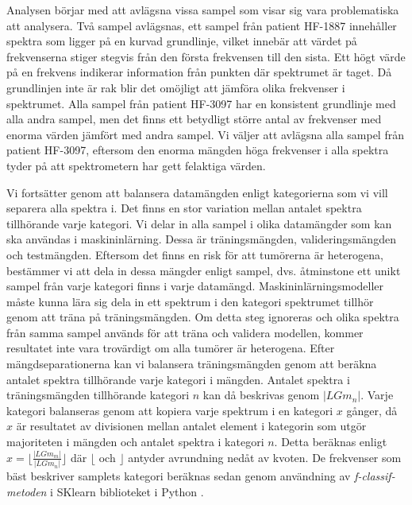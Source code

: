 Analysen börjar med att avlägsna vissa sampel som visar sig vara problematiska att analysera. Två sampel avlägsnas, ett sampel från patient HF-1887 innehåller spektra som ligger på en kurvad grundlinje, vilket innebär att värdet på frekvenserna stiger stegvis från den första frekvensen till den sista. Ett högt värde på en frekvens indikerar information från punkten där spektrumet är taget. Då grundlinjen inte är rak blir det omöjligt att jämföra olika frekvenser i spektrumet. Alla sampel från patient HF-3097 har en konsistent grundlinje med alla andra sampel, men det finns ett betydligt större antal av frekvenser med enorma värden jämfört med andra sampel. Vi väljer att avlägsna alla sampel från patient HF-3097, eftersom den enorma mängden höga frekvenser i alla spektra tyder på att spektrometern har gett felaktiga värden.

Vi fortsätter genom att balansera datamängden enligt kategorierna som vi vill separera alla spektra i. Det finns en stor variation mellan antalet spektra tillhörande varje kategori. Vi delar in alla sampel i olika datamängder som kan ska användas i maskininlärning. Dessa är träningsmängden, valideringsmängden och testmängden. Eftersom det finns en risk för att tumörerna är heterogena, bestämmer vi att dela in dessa mängder enligt sampel, dvs. åtminstone ett unikt sampel från varje kategori finns i varje datamängd. Maskininlärningsmodeller måste kunna lära sig dela in ett spektrum i den kategori spektrumet tillhör genom att träna på träningsmängden. Om detta steg ignoreras och olika spektra från samma sampel används för att träna och validera modellen, kommer resultatet inte vara trovärdigt om alla tumörer är heterogena. Efter mängdseparationerna kan vi balansera träningsmängden genom att beräkna antalet spektra tillhörande varje kategori i mängden. Antalet spektra i träningsmängden tillhörande kategori $n$ kan då beskrivas genom $|LGm_n|$. Varje kategori balanseras genom att kopiera varje spektrum i en kategori $x$ gånger, då $x$ är resultatet av divisionen mellan antalet element i kategorin som utgör majoriteten i mängden och antalet spektra i kategori $n$. Detta beräknas enligt $x = \lfloor \frac{|LGm_m|}{|LGm_n|} \rfloor$ där $\lfloor$ och $\rfloor$ antyder avrundning nedåt av kvoten. De frekvenser som bäst beskriver samplets kategori beräknas sedan genom användning av \textit{f-classif-metoden} i SKlearn biblioteket i Python \cite{scikit}.

